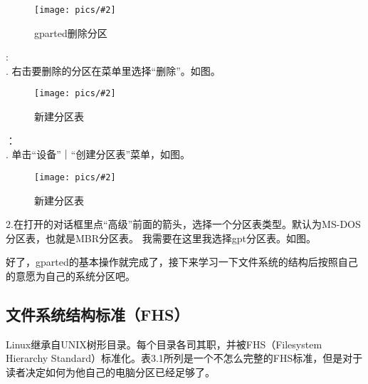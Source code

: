 \documentclass[amstex]{ctexbook}
\newcommand{\chatu}[3][0.35]{%
\begin{figure}[h]%
\centering%
\texttt{[image: pics/\#2]}%
\caption{#3\label{fig:#2}}%
\end{figure}%
}
\begin{document}
\chatu{gparted-delpart}{gparted删除分区}
:\\. 右击要删除的分区在菜单里选择“删除”。如图。 %

\chatu{gparted-newpt1.png}{新建分区表}

：\\. 单击“设备”｜“创建分区表”菜单，如图。

\chatu{gparted-newpt2.png}{新建分区表}

\indent2.在打开的对话框里点“高级”前面的箭头，选择一个分区表类型。默认为MS-DOS分区表，也就是MBR分区表。
我需要在这里我选择gpt分区表。如图。

\FloatBarrier

好了，gparted的基本操作就完成了，接下来学习一下文件系统的结构后按照自己的意愿为自己的系统分区吧。

\subsection{文件系统结构标准（FHS）}

Linux继承自UNIX树形目录。每个目录各司其职，并被FHS（Filesystem Hierarchy Standard）标准化。表3.1所列是一个不怎么完整的FHS标准，但是对于读者决定如何为他自己的电脑分区已经足够了。
\end{document}
